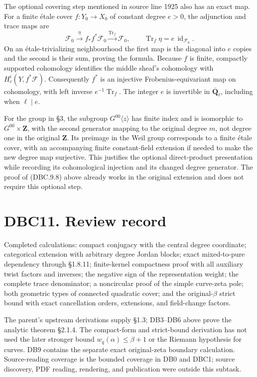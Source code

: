 \documentclass[
]{report}
\begin{document}
The optional covering step mentioned in source line 1925 also has an
exact map. For a finite étale cover \(f:Y_0\to X_0\) of constant degree
\(e>0\), the adjunction and trace maps are \[
\mathcal F_0\xrightarrow{\eta}f_*f^*\mathcal F_0
\xrightarrow{\operatorname{Tr}_f}\mathcal F_0,
\qquad\operatorname{Tr}_f\eta=e\,\operatorname{id}_{\mathcal F_0}.
\tag{DBC.10.3}
\] On an étale-trivializing neighbourhood the first map is the diagonal
into \(e\) copies and the second is their sum, proving the formula.
Because \(f\) is finite, compactly supported cohomology identifies the
middle sheaf's cohomology with \(H_c^i(Y,f^*\mathcal F)\). Consequently
\(f^*\) is an injective Frobenius-equivariant map on cohomology, with
left inverse \(e^{-1}\operatorname{Tr}_f\). The integer \(e\) is
invertible in \(\overline{\mathbf Q}_\ell\), including when
\(\ell\mid e\).

For the group in §3, the subgroup \(G^{00}\langle z\rangle\) has finite
index and is isomorphic to \(G^{00}\times\mathbf Z\), with the second
generator mapping to the original degree \(m\), not degree one in the
original \(\mathbf Z\). Its preimage in the Weil group corresponds to a
finite étale cover, with an accompanying finite constant-field extension
if needed to make the new degree map surjective. This justifies the
optional direct-product presentation while recording its cohomological
injection and its changed degree generator. The proof of (DBC.9.8) above
already works in the original extension and does not require this
optional step.

\section{DBC11. Review record}\label{dbc11.-review-record}

Completed calculations: compact conjugacy with the central degree
coordinate; categorical extension with arbitrary degree Jordan blocks;
exact mixed-to-pure dependency through §1.8.11; finite-kernel
compactness proof with all auxiliary twist factors and inverses; the
negative sign of the representation weight; the complete trace
denominator; a noncircular proof of the simple curve-zeta pole; both
geometric types of connected quadratic cover; and the original-\(\beta\)
strict bound with exact cancellation orders, extensions, and
field-change factors.

The parent's upstream derivations supply §1.3; DB3--DB6 above prove the
analytic theorem §2.1.4. The compact-form and strict-bound derivation
has not used the later stronger bound \(w_q(\alpha)\le\beta+1\) or the
Riemann hypothesis for curves. DB9 contains the separate exact
original-zeta boundary calculation. Source-reading coverage is the
bounded coverage in DB0 and DBC1; source discovery, PDF reading,
rendering, and publication were outside this subtask.
\end{document}
